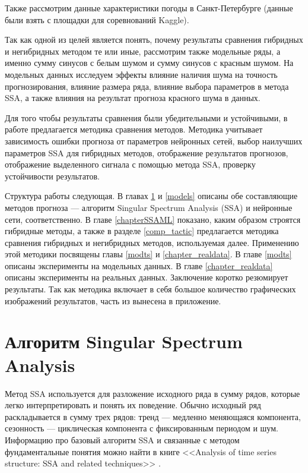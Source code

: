 \documentclass[specialist,
               substylefile = spbu.rtx,
               subf,href,colorlinks=true, 12p]{disser}
\begin{document}
Также рассмотрим данные характеристики погоды в Санкт-Петербурге (данные были взять с площадки для соревнований Kaggle).

Так как одной из целей является понять, почему результаты сравнения гибридных и негибридных методом те или иные, рассмотрим также модельные ряды, а именно сумму синусов с белым шумом и сумму синусов с красным шумом. На модельных данных исследуем эффекты влияние наличия шума на точность прогнозирования, влияние размера ряда, влияние выбора параметров в метода SSA, а также влияния на результат прогноза красного шума в данных.

Для того чтобы результаты сравнения были убедительными и устойчивыми, в работе предлагается методика сравнения методов. Методика учитывает зависимость ошибки прогноза от параметров нейронных сетей, выбор наилучших параметров SSA для гибридных методов, отображение результатов прогнозов, отображение выделенного сигнала с помощью метода SSA, проверку устойчивости результатов.

Структура работы следующая. В главах \ref{chapter_SSA} и \ref{models} описаны обе составляющие методов прогноза --- алгоритм Singular Spectrum Analysis (SSA) и нейронные сети, соответственно. В главе \ref{chapterSSAML} показано, каким образом строятся гибридные методы, а также в разделе \ref{comp_tactic} предлагается методика сравнения гибридных и негибридных методов, используемая далее. Применению этой методики посвящены главы \ref{modts} и \ref{chapter_realdata}. В главе \ref{modts} описаны эксперименты на модельных данных. В главе \ref{chapter_realdata} описаны эксперименты на реальных данных. Заключение коротко резюмирует результаты. Так как методика включает в себя большое количество графических изображений результатов, часть из вынесена в приложение.

\chapter{Алгоритм Singular Spectrum Analysis}
\label{chapter_SSA}
Метод SSA используется для разложение исходного ряда в сумму рядов, которые легко интерпретировать и понять их поведение. Обычно исходный ряд раскладывается в сумму трех рядов: тренд --- медленно меняющаяся компонента, сезонность --- циклическая компонента с фиксированным периодом и шум. Информацию про базовый алгоритм SSA и связанные с методом фундаментальные понятия можно найти в книге <<Analysis of time series structure: SSA and related techniques>> \cite{SSA}.
\end{document}
